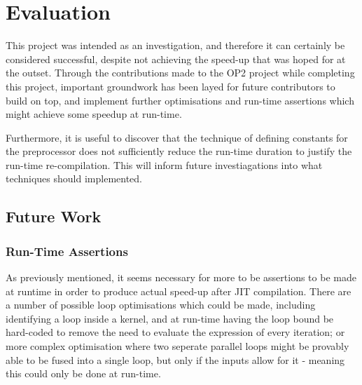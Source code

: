 
\section{Evaluation}
\label{s:eval}

This project was intended as an investigation, and therefore it can certainly be considered successful, despite not achieving the speed-up that was hoped for at the outset. Through the contributions made to the OP2 project while completing this project, important groundwork has been layed for future contributors to build on top, and implement further optimisations and run-time assertions which might achieve some speedup at run-time. \par Furthermore, it is useful to discover that the technique of defining constants for the preprocessor does not sufficiently reduce the run-time duration to justify the run-time re-compilation. This will inform future investiagations into what techniques should implemented.

\subsection{Future Work}
\label{ss:fw}

\subsubsection{Run-Time Assertions}
As previously mentioned, it seems necessary for more to be assertions to be made at runtime in order to produce actual speed-up after JIT compilation. There are a number of possible loop optimisations which could be made, including identifying a loop inside a kernel, and at run-time having the loop bound be hard-coded to remove the need to evaluate the expression of every iteration; or more complex optimisation where two seperate parallel loops might be provably able to be fused into a single loop, but only if the inputs allow for it - meaning this could only be done at run-time.

